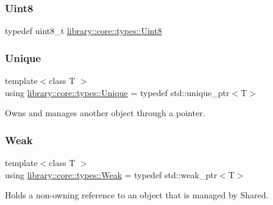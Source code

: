 \mbox{\label{namespacelibrary_1_1core_1_1types_a2fb690dd0eb982f92a642dbd0c985662}} 
\subsubsection{\texorpdfstring{Uint8}{Uint8}}
{\footnotesize\ttfamily typedef uint8\+\_\+t \mbox{\hyperlink{namespacelibrary_1_1core_1_1types_a2fb690dd0eb982f92a642dbd0c985662}{library\+::core\+::types\+::\+Uint8}}}

\mbox{\label{namespacelibrary_1_1core_1_1types_ac12d38691838fbc9a36765ee62ace52a}} 
\subsubsection{\texorpdfstring{Unique}{Unique}}
{\footnotesize\ttfamily template$<$class T $>$ \\
using \mbox{\hyperlink{namespacelibrary_1_1core_1_1types_ac12d38691838fbc9a36765ee62ace52a}{library\+::core\+::types\+::\+Unique}} = typedef std\+::unique\+\_\+ptr$<$T$>$}



Owns and manages another object through a pointer. 

\mbox{\label{namespacelibrary_1_1core_1_1types_a26c13c272f9fba4ce17ee4980be6703c}} 
\subsubsection{\texorpdfstring{Weak}{Weak}}
{\footnotesize\ttfamily template$<$class T $>$ \\
using \mbox{\hyperlink{namespacelibrary_1_1core_1_1types_a26c13c272f9fba4ce17ee4980be6703c}{library\+::core\+::types\+::\+Weak}} = typedef std\+::weak\+\_\+ptr$<$T$>$}



Holds a non-\/owning reference to an object that is managed by Shared. 



